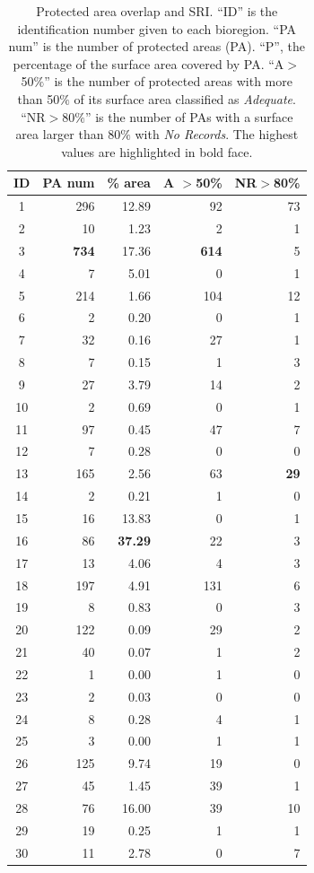 \documentclass[12pt,authoryear]{elsarticle}
\begin{document}
\begin{table}[]
    \centering
\caption{Protected area overlap and SRI. ``ID'' is the identification number given to each bioregion. ``PA num'' is the number of protected areas (PA). ``P'', the percentage of the surface area covered by PA. ``A$>$50$\%$'' is the number of protected areas with more than 50$\%$ of its surface area classified as \textit{Adequate}. ``NR$>80 \%$'' is the  number of PAs with a surface area larger than 80$\%$ with \textit{No Records}. The highest values are highlighted in bold face.}
\label{tab:AP}
\begin{tabular}{| c | r | r | r  | r |}
 \hline
  ID & PA num & \% area & A $>$50\% & NR$>$80\% \\
  \hline
   1 & 296 & 12.89 &  92 & 73 \\ 
   2 &  10 &  1.23 &   2 &  1 \\ 
   3 & \textbf{734} & 17.36 & \textbf{614} &  5 \\ 
   4 &   7 &  5.01 &   0 &  1 \\ 
   5 & 214 &  1.66 & 104 & 12 \\ 
   6 &   2 &  0.20 &   0 &  1 \\ 
   7 &  32 &  0.16 &  27 &  1 \\ 
   8 &   7 &  0.15 &   1 &  3 \\ 
   9 &  27 &  3.79 &  14 &  2 \\ 
  10 &   2 &  0.69 &   0 &  1 \\  
  11 &  97 &  0.45 &  47 &  7 \\ 
  12 &   7 &  0.28 &   0 &  0 \\ 
  13 & 165 &  2.56 &  63 & \textbf{29} \\ 
  14 &   2 &  0.21 &   1 &  0 \\ 
  15 &  16 & 13.83 &   0 &  1 \\ 
  16 &  86 & \textbf{37.29} &  22 &  3 \\ 
  17 &  13 &  4.06 &   4 &  3 \\ 
  18 & 197 &  4.91 & 131 &  6 \\ 
  19 &   8 &  0.83 &   0 &  3 \\ 
  20 & 122 &  0.09 &  29 &  2 \\ 
  21 &  40 &  0.07 &   1 &  2 \\ 
  22 &   1 &  0.00 &   1 &  0 \\ 
  23 &   2 &  0.03 &   0 &  0 \\ 
  24 &   8 &  0.28 &   4 &  1 \\ 
  25 &   3 &  0.00 &   1 &  1 \\ 
  26 & 125 &  9.74 &  19 &  0 \\ 
  27 &  45 &  1.45 &  39 &  1 \\ 
  28 &  76 & 16.00 &  39 & 10 \\ 
  29 &  19 &  0.25 &   1 &  1 \\ 
  30 &  11 &  2.78 &   0 &  7 \\ 
   \hline
\end{tabular}
\end{table}
\end{document}
